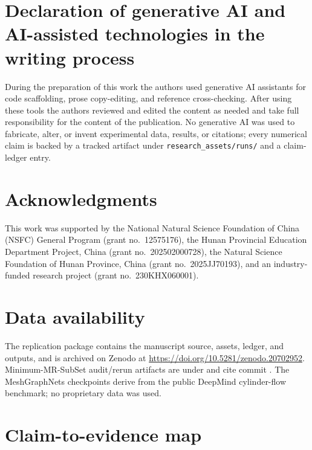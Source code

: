 \documentclass[preprint,12pt]{elsarticle}
\begin{document}
\section*{Declaration of generative AI and AI-assisted technologies in the writing process}
During the preparation of this work the authors used generative AI assistants for code scaffolding, prose copy-editing, and reference cross-checking. After using these tools the authors reviewed and edited the content as needed and take full responsibility for the content of the publication. No generative AI was used to fabricate, alter, or invent experimental data, results, or citations; every numerical claim is backed by a tracked artifact under \texttt{research\_assets/runs/} and a claim-ledger entry.

\section*{Acknowledgments}
This work was supported by the National Natural Science Foundation of China (NSFC) General Program (grant no.\ 12575176), the Hunan Provincial Education Department Project, China (grant no.\ 202502000728), the Natural Science Foundation of Hunan Province, China (grant no.\ 2025JJ70193), and an industry-funded research project (grant no.\ 230KHX060001).

\section*{Data availability}
The replication package contains the manuscript source, assets, ledger, and outputs, and is archived on Zenodo at \url{https://doi.org/10.5281/zenodo.20702952}. Minimum-MR-SubSet audit/rerun artifacts are under  and cite commit . The MeshGraphNets checkpoints derive from the public DeepMind cylinder-flow benchmark; no proprietary data was used.

\clearpage
\appendix
\renewcommand{\thetable}{A\arabic{table}}
\setcounter{table}{0}
\section{Claim-to-evidence map}
\label{app:claim-evidence}
\end{document}
